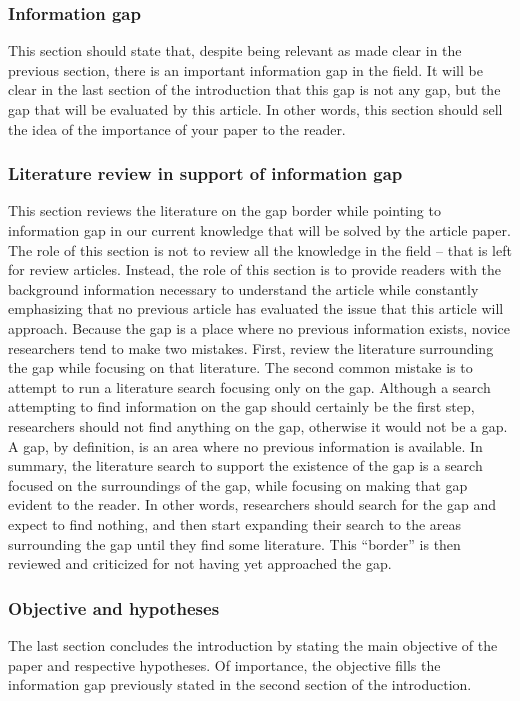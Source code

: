 \documentclass[11pt]{article}
\begin{document}
\subsubsection {Information gap}
This section should state that, despite being relevant as made clear in the previous section, there is an important information gap in the field. It will be clear in the last section of the introduction that this gap is not any gap, but the gap that will be evaluated by this article. In other words, this section should sell the idea of the importance of your paper to the reader.

\subsubsection {Literature review in support of information gap}
This section reviews the literature on the gap border while pointing to information gap in our current knowledge that will be solved by the article paper. The role of this section is not to review all the knowledge in the field -- that is left for review articles. Instead, the role of this section is to provide readers with the background information necessary to understand the article while constantly emphasizing that no previous article has evaluated the issue that this article will approach. Because the gap is a place where no previous information exists, novice researchers tend to make two mistakes. First, review the literature surrounding the gap while focusing on that literature.  The second common mistake is to attempt to run a literature search focusing only on the gap. Although a search attempting to find information on the gap should certainly be the first step, researchers should not find anything on the gap, otherwise it would not be a gap. A gap, by definition, is an area where no previous information is available. In summary, the literature search to support the existence of the gap is a search focused on the surroundings of the gap, while focusing on making that gap evident to the reader. In other words, researchers should search for the gap and expect to find nothing, and then start expanding their search to the areas surrounding the gap until they find some literature. This ``border'' is then reviewed and criticized for not having yet approached the gap.

\subsubsection {Objective and hypotheses}
The last section concludes the introduction by stating the main objective of the paper and respective hypotheses. Of importance, the objective fills the information gap previously stated in the second section of the introduction.
\end{document}
